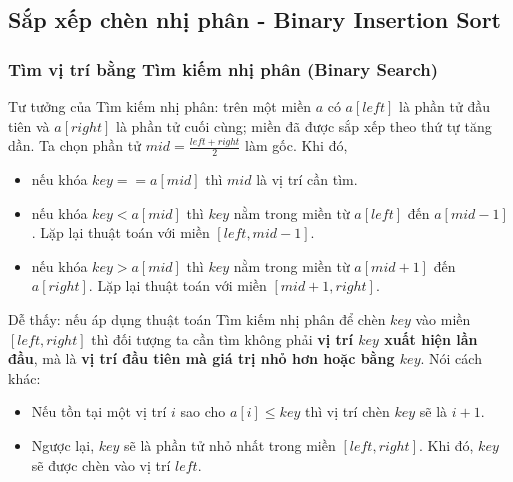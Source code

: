 \documentclass[]{article}
\begin{document}
\subsection{Sắp xếp chèn nhị phân - Binary Insertion Sort}
\label{subsec:bininsertsort}
\subsubsection{Tìm vị trí bằng Tìm kiếm nhị phân (Binary Search)}
Tư tưởng của Tìm kiếm nhị phân: trên một miền $a$ có $a[left]$ là phần tử đầu tiên và $a[right]$ là phần tử cuối cùng; miền đã được sắp xếp theo thứ tự tăng dần. Ta chọn phần tử $\displaystyle mid = \frac{left + right}{2}$ làm gốc. Khi đó,
\begin{itemize}
\item nếu khóa $key == a[mid]$ thì $mid$ là vị trí cần tìm.
\item nếu khóa $key < a[mid]$ thì $key$ nằm trong miền từ $a[left]$ đến $a[mid - 1]$. Lặp lại thuật toán với miền $[left, mid - 1]$.
\item nếu khóa $key > a[mid]$ thì $key$ nằm trong miền từ $a[mid + 1]$ đến $a[right]$. Lặp lại thuật toán với miền $[mid + 1, right]$.
\end{itemize}
Dễ thấy: nếu áp dụng thuật toán Tìm kiếm nhị phân để chèn $key$ vào miền $[left, right]$ thì đối tượng ta cần tìm không phải \textbf{vị trí $key$ xuất hiện lần đầu}, mà là \textbf{vị trí đầu tiên mà giá trị nhỏ hơn hoặc bằng $key$}. Nói cách khác:
\begin{itemize}
\item Nếu tồn tại một vị trí $i$ sao cho $a[i] \leq key$ thì vị trí chèn $key$ sẽ là $i + 1$.
\item Ngược lại, $key$ sẽ là phần tử nhỏ nhất trong miền $[left, right]$. Khi đó, $key$ sẽ được chèn vào vị trí $left$.
\end{itemize}
\end{document}
